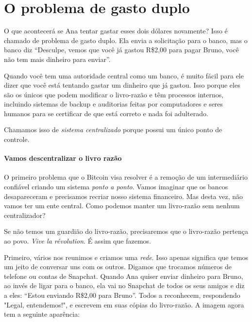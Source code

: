 \section*{O problema de gasto duplo}


O que acontecerá se Ana tentar gastar esses dois dólares novamente? Isso é chamado de problema de gasto duplo. Ela envia a solicitação para o banco, mas o banco diz “Desculpe, vemos que você já gastou R\$2,00 para pagar Bruno, você não tem mais dinheiro para enviar”.

Quando você tem uma autoridade central como um banco, é muito fácil para ele dizer que você está tentando gastar um dinheiro que já gastou. Isso porque eles são os únicos que podem modificar o livro-razão e têm processos internos, incluindo sistemas de backup e auditorias feitas por computadores e seres humanos para se certificar de que está correto e nada foi adulterado.

Chamamos isso de \textit{sistema centralizado} porque possui um único ponto de controle.

\paragraph{Vamos descentralizar o livro razão}
\paragraph{}

O primeiro problema que o Bitcoin visa resolver é a remoção de um intermediário confiável criando um sistema \textit{ponto a ponto}. Vamos imaginar que os bancos desapareceram e precisamos recriar nosso sistema financeiro. Mas desta vez, não vamos ter um ente central. Como podemos manter um livro-razão sem nenhum centralizador?

Se não temos um guardião do livro-razão, precisaremos que o livro-razão pertença ao povo. \textit{Vive la révolution}. É assim que fazemos.

Primeiro, vários nos reunimos e criamos uma \textit{rede}. Isso apenas significa que temos um jeito de conversar uns com os outros. Digamos que trocamos números de telefone ou contas de Snapchat. Quando Ana quiser enviar dinheiro para Bruno, ao invés de ligar para o banco, ela vai no Snapchat de todos os seus amigos e diz a eles: “Estou enviando R\$2,00 para Bruno”. Todos a reconhecem, respondendo "Legal, entendemos!", e escrevem em suas cópias do livro-razão. A imagem agora tem a seguinte aparência:

